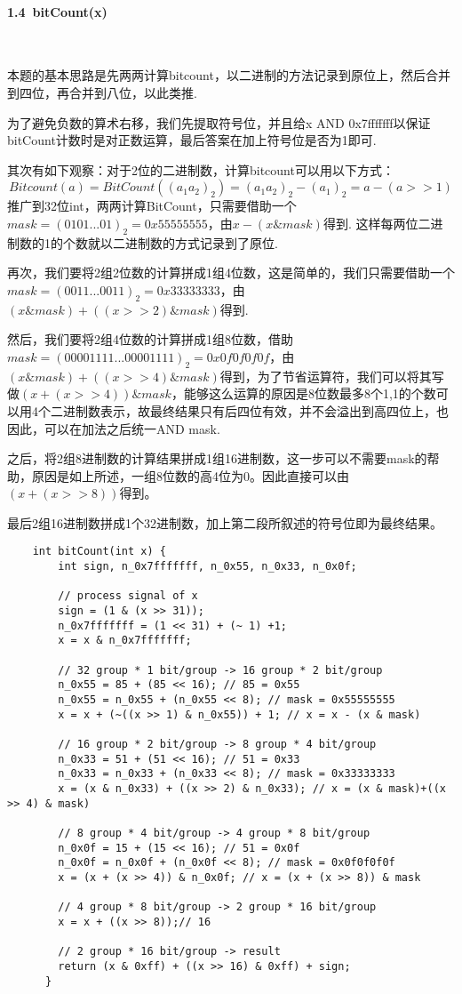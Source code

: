 \documentclass[UTF8]{ctexart}
\begin{document}
\paragraph*{1.4\ bitCount(x)}\ \par
本题的基本思路是先两两计算bitcount，以二进制的方法记录到原位上，然后合并到四位，再合并到八位，以此类推.\par
为了避免负数的算术右移，我们先提取符号位，并且给x AND 0x7fffffff以保证bitCount计数时是对正数运算，最后答案在加上符号位是否为1即可.\par
其次有如下观察：对于2位的二进制数，计算bitcount可以用以下方式：$$Bitcount(a)=BitCount((a_1a_2)_2)=(a_1a_2)_2-(a_1)_2=a - (a>>1)$$
推广到32位int，两两计算BitCount，只需要借助一个$mask=(0101...01)_2=0x55555555$，由$x-(x\&mask)$得到. 这样每两位二进制数的1的个数就以二进制数的方式记录到了原位.\par
再次，我们要将2组2位数的计算拼成1组4位数，这是简单的，我们只需要借助一个$mask=(0011...0011)_2=0x33333333$，由$(x\& mask)+((x>>2)\&mask)$得到. \par
然后，我们要将2组4位数的计算拼成1组8位数，借助$mask=(00001111...00001111)_2=0x0f0f0f0f$，由$(x\& mask)+((x>>4)\&mask)$得到，为了节省运算符，我们可以将其写做$(x+(x>>4))\&mask$，能够这么运算的原因是8位数最多8个1,1的个数可以用4个二进制数表示，故最终结果只有后四位有效，并不会溢出到高四位上，也因此，可以在加法之后统一AND mask.\par
之后，将2组8进制数的计算结果拼成1组16进制数，这一步可以不需要mask的帮助，原因是如上所述，一组8位数的高4位为0。因此直接可以由$(x+(x>>8))$得到。\par
最后2组16进制数拼成1个32进制数，加上第二段所叙述的符号位即为最终结果。
\begin{lstlisting}
    int bitCount(int x) {
        int sign, n_0x7fffffff, n_0x55, n_0x33, n_0x0f;
      
        // process signal of x
        sign = (1 & (x >> 31));
        n_0x7fffffff = (1 << 31) + (~ 1) +1;
        x = x & n_0x7fffffff;
      
        // 32 group * 1 bit/group -> 16 group * 2 bit/group 
        n_0x55 = 85 + (85 << 16); // 85 = 0x55
        n_0x55 = n_0x55 + (n_0x55 << 8); // mask = 0x55555555
        x = x + (~((x >> 1) & n_0x55)) + 1; // x = x - (x & mask)
      
        // 16 group * 2 bit/group -> 8 group * 4 bit/group 
        n_0x33 = 51 + (51 << 16); // 51 = 0x33
        n_0x33 = n_0x33 + (n_0x33 << 8); // mask = 0x33333333
        x = (x & n_0x33) + ((x >> 2) & n_0x33); // x = (x & mask)+((x >> 4) & mask)
      
        // 8 group * 4 bit/group -> 4 group * 8 bit/group 
        n_0x0f = 15 + (15 << 16); // 51 = 0x0f
        n_0x0f = n_0x0f + (n_0x0f << 8); // mask = 0x0f0f0f0f
        x = (x + (x >> 4)) & n_0x0f; // x = (x + (x >> 8)) & mask
      
        // 4 group * 8 bit/group -> 2 group * 16 bit/group 
        x = x + ((x >> 8));// 16
      
        // 2 group * 16 bit/group -> result
        return (x & 0xff) + ((x >> 16) & 0xff) + sign;
      }
\end{lstlisting}
\end{document}
